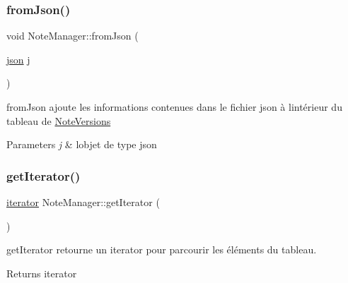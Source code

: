 \subsubsection{\texorpdfstring{from\+Json()}{fromJson()}}
{\footnotesize\ttfamily void Note\+Manager\+::from\+Json (\begin{DoxyParamCaption}\item[{\hyperlink{classnlohmann_1_1basic__json}{json}}]{j }\end{DoxyParamCaption})}



from\+Json ajoute les informations contenues dans le fichier json à l\textquotesingle{}intérieur du tableau de \hyperlink{classNoteVersions}{Note\+Versions} 


\begin{DoxyParams}{Parameters}
{\em j} & l\textquotesingle{}objet de type json \\
\hline
\end{DoxyParams}
\mbox{\label{classNoteManager_ab61b63ebe1e10b97635ffc5c13820121}} 
\subsubsection{\texorpdfstring{get\+Iterator()}{getIterator()}}
{\footnotesize\ttfamily \hyperlink{classNoteManager_1_1iterator}{iterator} Note\+Manager\+::get\+Iterator (\begin{DoxyParamCaption}{ }\end{DoxyParamCaption})\hspace{0.3cm}{\ttfamily [inline]}}



get\+Iterator retourne un iterator pour parcourir les éléments du tableau. 

\begin{DoxyReturn}{Returns}
iterator 
\end{DoxyReturn}
\mbox{\label{classNoteManager_a3bfcec9380fa00d216be61126e2a9459}} 
